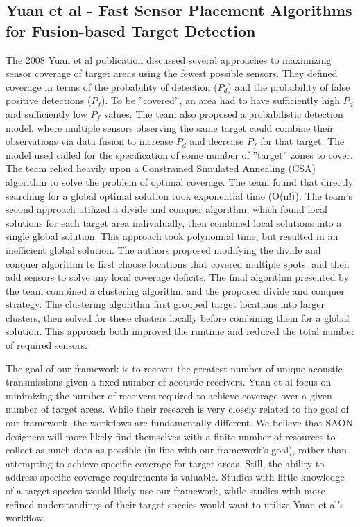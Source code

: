 \subsection{Yuan et al - Fast Sensor Placement Algorithms for Fusion-based Target Detection}
The 2008 Yuan et al publication discussed several approaches to maximizing sensor coverage of target areas using the fewest possible sensors.  They defined coverage in terms of the probability of detection ($P_d$) and the probability of false positive detections ($P_f$).  To be ''covered'', an area had to have sufficiently high $P_d$ and sufficiently low $P_f$ values.  The team also proposed a probabilistic detection model, where multiple sensors observing the same target could combine their observations via  data fusion to increase $P_d$ and decrease $P_f$ for that target. The model used called for the specification of some number of ''target'' zones to cover.  The team relied heavily upon a Constrained Simulated Annealing (CSA) algorithm to solve the problem of optimal coverage.  The team found that directly searching for a global optimal solution took exponential time (O(n!)).  The team's second approach utilized a divide and conquer algorithm, which found local solutions for each target area individually, then combined local solutions into a single global solution.  This approach took polynomial time, but resulted in an inefficient global solution.  The authors proposed modifying the divide and conquer algorithm to first choose locations that covered multiple spots, and then add sensors to solve any local coverage deficits.  The final algorithm presented by the team combined a clustering algorithm and the proposed divide and conquer strategy.  The clustering algorithm first grouped target locations into larger clusters, then solved for these clusters locally before combining them for a global solution.  This approach both improved the runtime and reduced the total number of required sensors.

The goal of our framework is to recover the greatest number of unique acoustic transmissions given a fixed number of acoustic receivers.  Yuan et al focus on minimizing the number of receivers required to achieve coverage over a given number of target areas.  While their research is very closely related to the goal of our framework, the workflows are fundamentally different.  We believe that SAON designers will more likely find themselves with a finite number of resources to collect as much data as possible (in line with our framework's goal), rather than attempting to achieve specific coverage for target areas.  Still, the ability to address specific coverage requirements is valuable.  Studies with little knowledge of a target species would likely use our framework, while studies with more refined understandings of their target species would want to utilize Yuan et al's workflow.  


